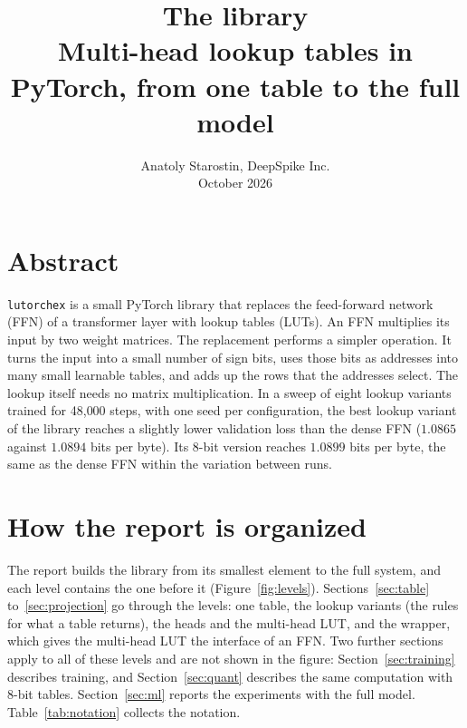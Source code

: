 \documentclass[11pt]{article}
\title{\vspace{-2.5em}\textbf{The \code{lutorch\_ex} library}\\[2pt]\large Multi-head lookup tables in PyTorch, from one table to the full model}
\author{Anatoly Starostin, DeepSpike Inc.\\[3pt]\normalsize October 2026}
\date{}
\DeclareRobustCommand{\code}[1]{{\renewcommand{\_}{\textunderscore\allowbreak}\texttt{#1}}}
\begin{document}
\maketitle
\vspace{-3.5em}

\section*{Abstract}

\code{lutorch\_ex} is a small PyTorch library that replaces the feed-forward network (FFN) of a
transformer layer with lookup tables (LUTs). An FFN multiplies its input by two weight matrices. The
replacement performs a simpler operation. It turns the input into a small number of sign bits, uses those
bits as addresses into many small learnable tables, and adds up the rows that the addresses select. The
lookup itself needs no matrix multiplication. In a sweep of eight lookup variants trained for 48{,}000
steps, with one seed per configuration, the best lookup variant of the library reaches a slightly lower
validation loss than the dense FFN ($1.0865$ against $1.0894$ bits per byte). Its 8-bit version reaches
$1.0899$ bits per byte, the same as the dense FFN within the variation between runs.

\section*{How the report is organized}

The report builds the library from its smallest element to the full system, and each level contains the
one before it (Figure~\ref{fig:levels}). Sections~\ref{sec:table} to~\ref{sec:projection} go through the
levels: one table, the lookup variants (the rules for what a table returns), the heads and the multi-head LUT,
and the wrapper, which gives the multi-head LUT the interface of an FFN. Two further sections apply to
all of these levels and are not shown in the figure: Section~\ref{sec:training} describes training, and
Section~\ref{sec:quant} describes the same computation with 8-bit tables. Section~\ref{sec:ml} reports the
experiments with the full model. Table~\ref{tab:notation} collects the notation.
\end{document}
